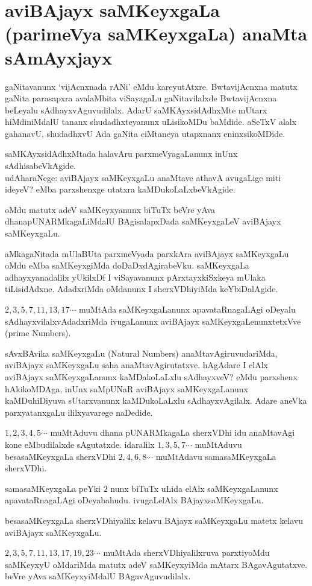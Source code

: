 \chapter{aviBAjayx saMKeyxgaLa (parimeVya saMKeyxgaLa) anaMta sAmAyxjayx}

gaNitavanunx `vijAcnxnada rANi' eMdu kareyutAtxre. BwtavijAcnxna matutx gaNita \-parasapxra avalaMbita viSayagaLu gaNitavilalxde BwtavijAcnxna beLeyalu sAdhayxvAguvudilalx. AdarU saMKAyxsidAdhxMte mUtarx hiMdiniMdalU tananx shudadhxteyanunx uLisikoMDu baMdide. aSeTxV alalx gahanavU, shudadhxvU Ada gaNita ciMtaneya utapxnanx eninxsikoMDide.

saMKAyxsidAdhxMtada halavAru parxmeVyagaLanunx inUnx sAdhisabeVkAgide. \\
udAharaNege: aviBAjayx saMKeyxgaLu anaMtave athavA avugaLige miti ideyeV? eMba parxshenxge utatxra kaMDukoLaLxbeVkAgide. 

oMdu matutx adeV saMKeyxyanunx biTuTx beVre yAva dhanapUNARMkagaLiMdalU BAgisalapxDada saMKeyxgaLeV aviBAjayx saMKeyxgaLu.

aMkagaNitada mUlaBUta parxmeVyada parxkAra aviBAjayx saMKeyxgaLu oMdu eMba saMKeyxgiMda doDaDxdAgirabeVku. saMKeyxgaLa adhayxyanadalilx yUkilxDf I viSayavanunx pArxtayxkiSxkeya mUlaka tiLisidAdxne. AdadxriMda oMdanunx I sherxVDhiyiMda keYbiDalAgide.
 
 $2,3,5,7,11,13,17\cdots$ muMtAda saMKeyxgaLanunx apavataRnagaLAgi oDeyalu sAdhayxvilalxvAdadxriMda ivugaLanunx aviBAjayx saMKeyxgaLenunxtetxVve {\rm (prime Numbers)}.

sAvxBAvika saMKeyxgaLu {\rm (Natural Numbers)} anaMtavAgiruvudariMda, aviBAjayx saMKeyxgaLu saha anaMtavAgirutatxve. hAgAdare I elAlx aviBAjayx saMKeyxgaLanunx kaMDakoLaLxlu sAdhayxveV? eMdu parxshenx hAkikoMDAga, inUnx saMpUNaR aviBAjayx saMKeyxgaLanunx kaMDuhiDiyuva sUtarxvanunx kaMDukoLaLxlu sAdhayxvAgilalx. Adare aneVka parxyatanxgaLu ililxyavarege naDedide.

$1,2,3,4,5\cdots$ muMtAduvu dhana pUNARMkagaLa sherxVDhi idu anaMtavAgi kone eMbudilalxde sAgutatxde. idaralilx $1,3,5,7\cdots$ muMtAduvu besasaMKeyxgaLa sherxVDhi $2,4,6,8\cdots$ muMtAdavu samasaMKeyxgaLa sherxVDhi.

samasaMKeyxgaLa peYki $2$ nunx biTuTx uLida elAlx saMKeyxgaLanunx apavataRnagaLAgi oDeyabahudu. ivugaLelAlx BAjayxsaMKeyxgaLu.

besasaMKeyxgaLa sherxVDhiyalilx kelavu BAjayx saMKeyxgaLu matetx kelavu aviBAjayx saMKeyxgaLu.

$2,3,5,7,11,13,17,19,23\cdots$ muMtAda sherxVDhiyalilxruva parxtiyoMdu saMKeyxyU oMdariMda matutx adeV saMKeyxyiMda mAtarx BAgavAgutatxve. beVre yAva \-saMKeyxyiMdalU BAgavAguvudilalx.

